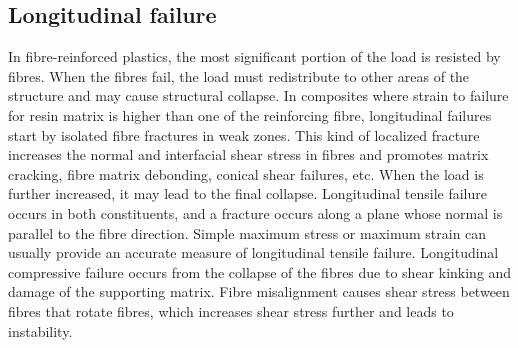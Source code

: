 \documentclass[a4paper,12pt,twoside]{report}
\begin{document}
\subsection{Longitudinal failure}
\indent\indent\indent  In fibre-reinforced plastics, the most significant portion of the load is resisted by fibres. When the fibres fail, the load must redistribute to other areas of the structure and may cause structural collapse. In composites where strain to failure for resin matrix is higher than one of the reinforcing fibre, longitudinal failures start by isolated fibre fractures in weak zones. This kind of localized fracture increases the normal and interfacial shear stress in fibres and promotes matrix cracking, fibre matrix debonding, conical shear failures, etc. When the load is further increased, it may lead to the final collapse. Longitudinal tensile failure occurs in both constituents, and a fracture occurs along a plane whose normal is parallel to the fibre direction. Simple maximum stress or maximum strain can usually provide an accurate measure of longitudinal tensile failure. Longitudinal compressive failure occurs from the collapse of the fibres due to shear kinking and damage of the supporting matrix. Fibre misalignment causes shear stress between fibres that rotate fibres, which increases shear stress further and leads to instability. 
 
\end{document}
